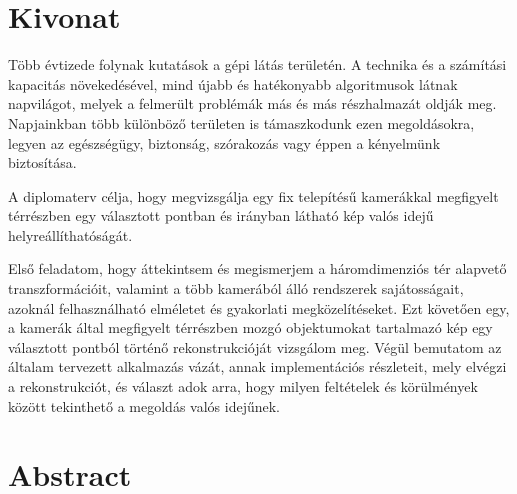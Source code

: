 
\hungarianParagraph

\chapter*{Kivonat}

Több évtizede folynak kutatások a gépi látás területén. A technika és a számítási kapacitás növekedésével, mind újabb és hatékonyabb algoritmusok látnak napvilágot, melyek a felmerült problémák más és más részhalmazát oldják meg. Napjainkban több különböző területen is támaszkodunk ezen megoldásokra, legyen az egészségügy, biztonság, szórakozás vagy éppen a kényelmünk biztosítása.

A diplomaterv célja, hogy megvizsgálja egy fix telepítésű kamerákkal megfigyelt térrészben egy választott pontban és irányban látható kép valós idejű helyreállíthatóságát.

Első feladatom, hogy áttekintsem és megismerjem a háromdimenziós tér alapvető transzformációit, valamint a több kamerából álló rendszerek sajátosságait, azoknál felhasználható elméletet és gyakorlati megközelítéseket. Ezt követően egy, a kamerák által megfigyelt térrészben mozgó objektumokat tartalmazó kép egy választott pontból történő rekonstrukcióját vizsgálom meg. Végül bemutatom az általam tervezett alkalmazás vázát, annak implementációs részleteit, mely elvégzi a rekonstrukciót, és választ adok arra, hogy milyen feltételek és körülmények között tekinthető a megoldás valós idejűnek.


\vfill


\englishParagraph

\chapter*{Abstract}

\vfill



\dolgozatnyelve
{}

\setcounter{romanPage}{\value{page}}
